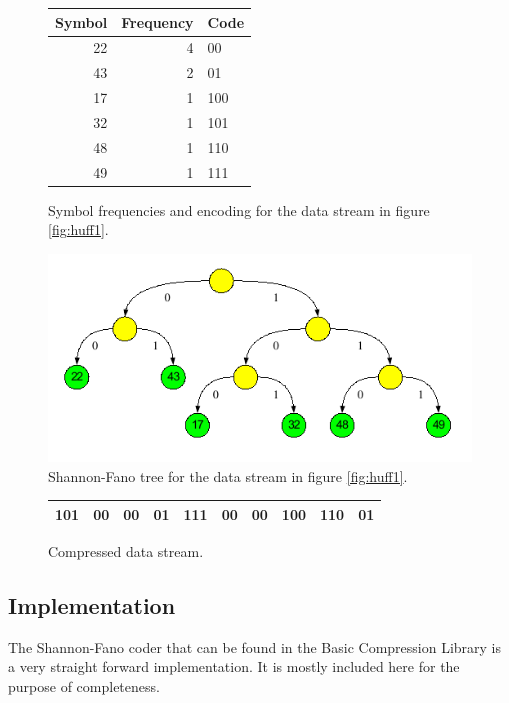 \documentclass[a4paper,11pt,oneside]{report}
\begin{document}
\begin{figure}[p]
\begin{center}
\begin{tabular}{|r|r|l|}\hline
\textbf{Symbol} & \textbf{Frequency} & \textbf{Code}\\\hline
22 & 4 & 00\\\hline
43 & 2 & 01\\\hline
17 & 1 & 100\\\hline
32 & 1 & 101\\\hline
48 & 1 & 110\\\hline
49 & 1 & 111\\\hline
\end{tabular}
\end{center}
\caption{Symbol frequencies and encoding for the data stream in figure \ref{fig:huff1}.}
\label{fig:huff2}
\end{figure}

\begin{figure}[p]
\begin{center}
\includegraphics[width=15cm]{huffman_tree}
\end{center}
\caption{Shannon-Fano tree for the data stream in figure \ref{fig:huff1}.}
\label{fig:huff3}
\end{figure}

\begin{figure}[p]
\begin{center}
\begin{tabular}{|l|l|l|l|l|l|l|l|l|l|}\hline
101 & 00 & 00 & 01 & 111 & 00 & 00 & 100 & 110 & 01\\\hline
\end{tabular}
\end{center}
\caption{Compressed data stream.}
\label{fig:huff4}
\end{figure}


\subsection{Implementation}
The Shannon-Fano coder that can be found in the Basic Compression Library
is a very straight forward implementation. It is mostly included here for
the purpose of completeness.
\end{document}
